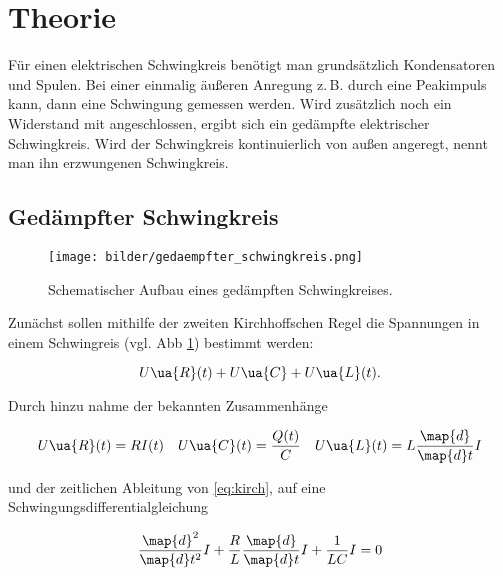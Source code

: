 \setcounter{page}{1}

\section{Theorie}

Für einen elektrischen Schwingkreis benötigt man grundsätzlich
Kondensatoren und Spulen.
Bei einer einmalig äußeren Anregung z.\,B. durch eine Peakimpuls
kann, dann eine Schwingung gemessen werden.
Wird zusätzlich noch ein Widerstand mit angeschlossen, ergibt sich ein
gedämpfte elektrischer Schwingkreis.
Wird der Schwingkreis kontinuierlich von außen angeregt, nennt man
ihn erzwungenen Schwingkreis.

\subsection{Gedämpfter Schwingkreis}
\begin{figure}
  \centering
  \texttt{[image: bilder/gedaempfter\_schwingkreis.png]}
  \caption{Schematischer Aufbau eines gedämpften Schwingkreises\cite{anleitung354}. }
  \label{fig:gedaempft}
  \end{figure}
Zunächst sollen mithilfe der zweiten
Kirchhoffschen Regel die Spannungen in einem Schwingreis (vgl. Abb \ref{fig:gedaempft})
bestimmt werden:

\begin{equation}
  \label{eq:kirch}
U\ua{R}(t)+U\ua{C}+U\ua{L}(t).
\end{equation}

Durch hinzu nahme der bekannten Zusammenhänge

\begin{equation*}
U\ua{R}(t)=RI(t) \quad U\ua{C}(t)=\frac{Q(t)}{C} \quad U\ua{L}(t)=L\frac{\map{d}}{\map{d}t}I
\end{equation*}

und der zeitlichen Ableitung von \eqref{eq:kirch}, auf eine Schwingungsdifferentialgleichung

\begin{equation}
  \label{eq:differntialgleichung_1}
\frac{\map{d}^2}{\map{d}t^2}I+\frac{R}{L}\frac{\map{d}}{\map{d}t}I+\frac{1}{LC}I=0
\end{equation}

